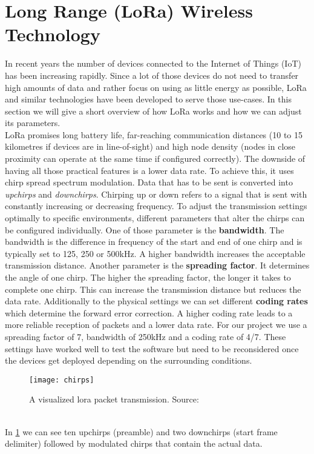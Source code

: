 \section{Long Range (LoRa) Wireless Technology}
\label{sec:lora}
In recent years the number of devices connected to the Internet of Things (IoT) has been increasing rapidly. Since a lot of those devices do not need to transfer high amounts of data and rather focus on using as little energy as possible, LoRa and similar technologies have been developed to serve those use-cases. In this section we will give a short overview of how LoRa works and how we can adjust its parameters. \\
LoRa promises long battery life, far-reaching communication distances (10 to 15 kilometres if devices are in line-of-sight) and high node density (nodes in close proximity can operate at the same time if configured correctly). The downside of having all those practical features is a lower data rate. To achieve this, it uses chirp spread spectrum modulation. Data that has to be sent is converted into \textit{upchirps} and \textit{downchirps}. Chirping up or down refers to a signal that is sent with constantly increasing or decreasing frequency. To adjust the transmission settings optimally to specific environments, different parameters that alter the chirps can be configured individually. One of those parameter is the \textbf{bandwidth}. The bandwidth is the difference in frequency of the start and end of one chirp and is typically set to 125, 250 or 500kHz. A higher bandwidth increases the acceptable transmission distance. Another parameter is the \textbf{spreading factor}. It determines the angle of one chirp. The higher the spreading factor, the longer it takes to complete one chirp. This can increase the transmission distance but reduces the data rate. Additionally to the physical settings we can set different \textbf{coding rates} which determine the forward error correction. A higher coding rate leads to a more reliable reception of packets and a lower data rate.
For our project we use a spreading factor of 7, bandwidth of 250kHz and a coding rate of 4/7. These settings have worked well to test the software but need to be reconsidered once the devices get deployed depending on the surrounding conditions.
\begin{figure}
\centering
\texttt{[image: chirps]}
\caption{A visualized lora packet transmission. Source:~\cite{10.1145/3293534}}
\label{fig:chirps}
\end{figure} \\
In \cref{fig:chirps} we can see ten upchirps (preamble) and two downchirps (start frame delimiter) followed by modulated chirps that contain the actual data. 

